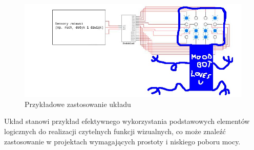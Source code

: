 \documentclass[11pt]{article}
\begin{document}
\begin{figure}[H]
\centering
\includegraphics[width=.9\linewidth]{unholy_abomination.jpg}
\caption{Przykładowe zastosowanie układu}
\end{figure}

Układ stanowi przykład efektywnego wykorzystania podstawowych elementów logicznych do realizacji czytelnych funkcji wizualnych,
co może znaleźć zastosowanie w projektach wymagających prostoty i niskiego poboru mocy.
\end{document}
